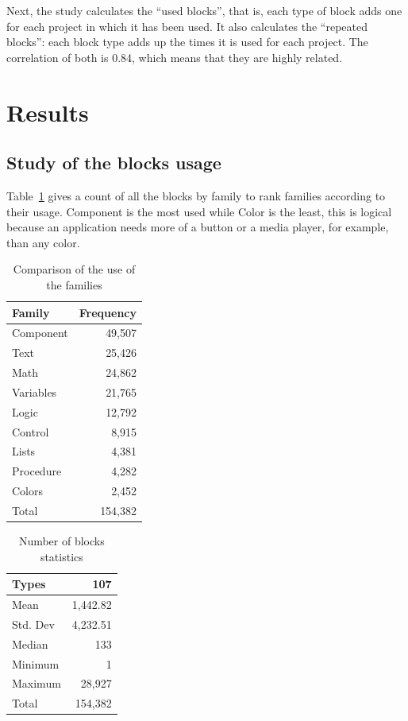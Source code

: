 \documentclass[a4paper]{article}
\begin{document}
Next, the study calculates the ``used blocks'', that is, each type of block adds one for each project in which it has been used. It also calculates the ``repeated blocks'': each block type adds up the times it is used for each project. The correlation of both is 0.84, which means that they are highly related.

\section{Results}
\subsection{Study of the blocks usage}
Table~\ref{tab:block-fam-comp} gives a count of all the blocks by family to rank families according to their usage. Component is the most used while Color is the least, this is logical because an application needs more of a button or a media player, for example, than any color.

\begin{table}
\begin{center}
\caption{Comparison of the use of the families}
\bigskip
\label{tab:block-fam-comp}
\begin{tabular}{|l|r|}
\hline
\textbf{Family} & \textbf{Frequency} \\ \hline
Component & 49,507 \\ \hline
Text	& 25,426\\ \hline
Math & 24,862\\ \hline
Variables & 21,765\\ \hline
Logic & 12,792\\ \hline
Control & 8,915\\ \hline
Lists & 4,381\\ \hline
Procedure & 4,282\\ \hline
Colors & 2,452\\ \hline
Total & 154,382\\ \hline
\end{tabular}
\end{center}
\end{table}

\begin{table}[ht]
\begin{center}
\caption{Number of blocks statistics}
\bigskip
\label{tab:number-blocks}
\begin{tabular}{|l|r|}
\hline
Types & 107\\ \hline
Mean & 1,442.82\\ \hline
Std. Dev & 4,232.51\\ \hline
Median & 133\\ \hline
Minimum & 1\\ \hline
Maximum & 28,927\\ \hline
Total & 154,382\\ \hline
\end{tabular}
\end{center}
\end{table}
\end{document}
